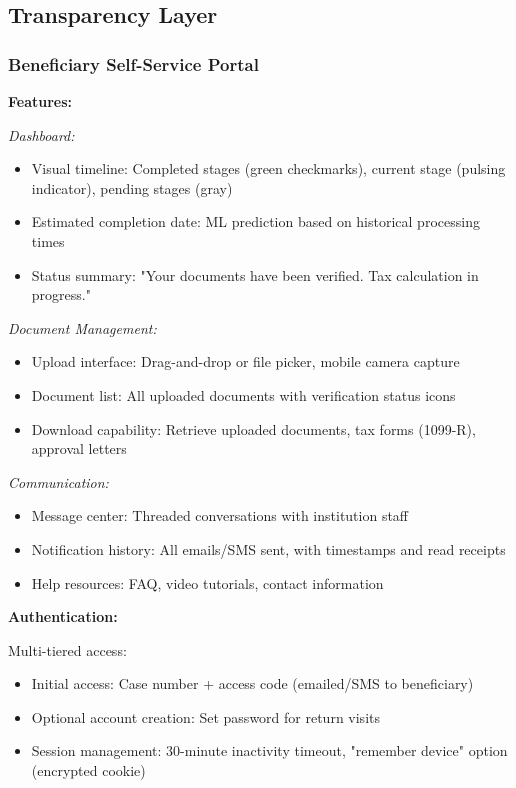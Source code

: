 \subsection{Transparency Layer}

\subsubsection{Beneficiary Self-Service Portal}

\textbf{Features:}

\textit{Dashboard:}
\begin{itemize}
\item Visual timeline: Completed stages (green checkmarks), current stage (pulsing indicator), pending stages (gray)
\item Estimated completion date: ML prediction based on historical processing times
\item Status summary: "Your documents have been verified. Tax calculation in progress."
\end{itemize}

\textit{Document Management:}
\begin{itemize}
\item Upload interface: Drag-and-drop or file picker, mobile camera capture
\item Document list: All uploaded documents with verification status icons
\item Download capability: Retrieve uploaded documents, tax forms (1099-R), approval letters
\end{itemize}

\textit{Communication:}
\begin{itemize}
\item Message center: Threaded conversations with institution staff
\item Notification history: All emails/SMS sent, with timestamps and read receipts
\item Help resources: FAQ, video tutorials, contact information
\end{itemize}

\textbf{Authentication:}

Multi-tiered access:
\begin{itemize}
\item Initial access: Case number + access code (emailed/SMS to beneficiary)
\item Optional account creation: Set password for return visits
\item Session management: 30-minute inactivity timeout, "remember device" option (encrypted cookie)
\end{itemize}

